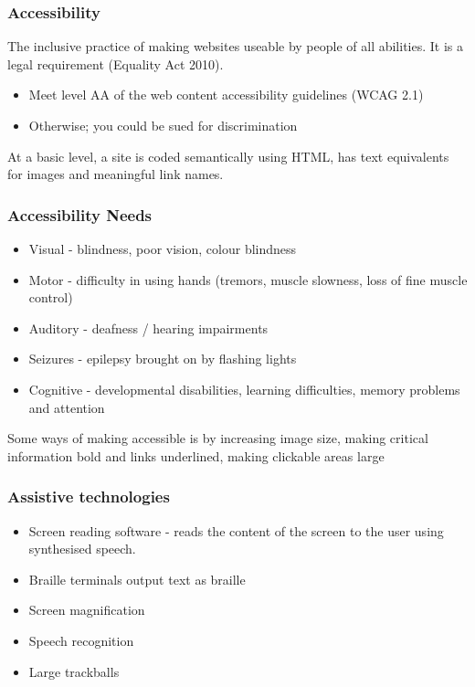 \documentclass[a4paper]{article}
\theoremstyle{plain}
\theoremstyle{definition}
\theoremstyle{remark}
\begin{document}
\begin{flushleft}
	\subsubsection{Accessibility}
	The inclusive practice of making websites useable by people of all abilities. It is a legal requirement (Equality Act 2010).
	\begin{itemize}
		\item Meet level AA of the web content accessibility guidelines (WCAG 2.1)
		\item Otherwise; you could be sued for discrimination
	\end{itemize}
	At a basic level, a site is coded semantically using HTML, has text equivalents for images and meaningful link names.
	\subsubsection{Accessibility Needs }
	\begin{itemize}
		\item Visual - blindness, poor vision, colour blindness
		\item Motor - difficulty in using hands (tremors, muscle slowness, loss of fine muscle control)
		\item Auditory - deafness / hearing impairments
		\item Seizures - epilepsy brought on by flashing lights
		\item Cognitive - developmental disabilities, learning difficulties, memory problems and attention
	\end{itemize}
	Some ways of making accessible is by increasing image size, making critical information bold and links underlined, making clickable areas large
	\subsubsection{Assistive technologies}
	\begin{itemize}
		\item Screen reading software - reads the content of the screen to the user using synthesised speech.
		\item Braille terminals output text as braille
		\item Screen magnification
		\item Speech recognition
		\item Large trackballs
	\end{itemize}

\end{flushleft}
\end{document}
